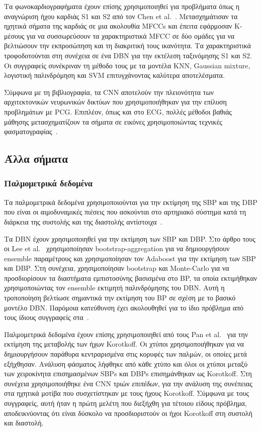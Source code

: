 Τα φωνοκαρδιογραφήματα έχουν επίσης χρησιμοποιηθεί για προβλήματα όπως η αναγνώριση ήχου καρδιάς S1 και S2 από τον Chen et al.~\cite{chen2017s1}.
Μετασχημάτισαν τα ηχητικά σήματα της καρδιάς σε μια ακολουθία MFCCs και έπειτα εφάρμοσαν Κ-μέσους για να συσσωρεύσουν τα χαρακτηριστικά MFCC σε δύο ομάδες για να βελτιώσουν την εκπροσώπηση και τη διακριτική τους ικανότητα.
Τα χαρακτηριστικά τροφοδοτούνται στη συνέχεια σε ένα DBN για την εκτέλεση ταξινόμησης S1 και S2.
Οι συγγραφείς συνέκριναν τη μέθοδο τους με τα μοντέλα KNN, Gaussian mixture, λογιστική παλινδρόμηση και SVM επιτυγχάνοντας καλύτερα αποτελέσματα.

Σύμφωνα με τη βιβλιογραφία, τα CNN αποτελούν την πλειονότητα των αρχιτεκτονικών νευρωνικών δικτύων που χρησιμοποιήθηκαν για την επίλυση προβλημάτων με PCG\@.
Επιπλέον, όπως και στο ECG, πολλές μέθοδοι βαθιάς μάθησης μετασχηματίζουν τα σήματα σε εικόνες χρησιμοποιώντας τεχνικές φασματογραφίας~\cite{potes2016ensemble, rubin2017recognizing, kucharski2017deep, dominguez2018deep, pan2017variation, shashikumar2017deep}.

\subsection{Άλλα σήματα}
\subsubsection{Παλμομετρικά δεδομένα}
Τα παλμομετρικά δεδομένα χρησιμοποιούνται για την εκτίμηση της SBP και της DBP που είναι οι αιμοδυναμικές πιέσεις που ασκούνται στο αρτηριακό σύστημα κατά τη διάρκεια της συστολής και της διαστολής αντίστοιχα~\cite{everly2012clinical}.

Τα DBN έχουν χρησιμοποιηθεί για την εκτίμηση των SBP και DBP\@.
Στο άρθρο τους οι Lee et al.~\cite{lee2017deepa} χρησιμοποίησαν bootstrap-aggregation για να δημιουργήσουν ensemble παραμέτρους και χρησιμοποίησαν τον Adaboost για την εκτίμηση των SBP και DBP\@.
Στη συνέχεια, χρησιμοποίησαν bootstrap και Monte-Carlo για να προσδιορίσουν τα διαστήματα εμπιστοσύνης βασισμένα στο BP, τα οποία εκτιμήθηκαν χρησιμοποιώντας τον ensemble εκτιμητή παλινδρόμησης του DBN\@.
Αυτή η τροποποίηση βελτίωσε σημαντικά την εκτίμηση του BP σε σχέση με το βασικό μοντέλο DBN\@.
Παρόμοια κατεύθυνση έχει ακολουθηθεί για το ίδιο πρόβλημα από τους ίδιους συγγραφείς στα~\cite{lee2017oscillometric, lee2017deepc, lee2017deepd}.

Παλμομετρικά δεδομένα έχουν επίσης χρησιμοποιηθεί από τους Pan et al.~\cite{pan2017variation} για την εκτίμηση της μεταβολής των ήχων Korotkoff.
Οι χτύποι χρησιμοποιήθηκαν για να δημιουργήσουν παράθυρα κεντραρισμένα στις κορυφές των παλμών, οι οποίες μετά εξήχθησαν.
Ανάλυση φάσματος λήφθηκε από κάθε χτύπο και όλοι οι χτύποι μεταξύ των χειροκίνητα επισημασμένων SBPs και DBPs επισημάνθηκαν ως Korotkoff.
Στη συνέχεια χρησιμοποιήθηκε ένα CNN τριών \textit{επιπέδων}, για την ανάλυση της συνέπειας στα ηχητικά μοτίβα που συσχετίστηκαν με τους ήχους Korotkoff.
Σύμφωνα με τους συγγραφείς, αυτή ήταν η πρώτη μελέτη που διεξήχθη για τέτοιου είδους πρόβλημα, αποδεικνύοντας ότι είναι δύσκολο να προσδιοριστούν οι ήχοι Korotkoff στη συστολή και διαστολή.

